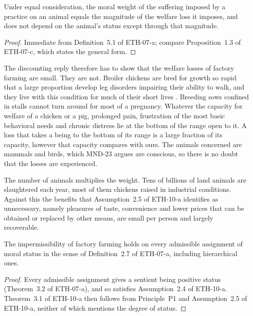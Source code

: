 \documentclass{situationist-preprint}
\begin{document}
\begin{proposition}\label{p:weight}
Under equal consideration, the moral weight of the suffering imposed by a practice on an animal equals the magnitude of the welfare loss it imposes, and does not depend on the animal's status except through that magnitude.
\end{proposition}

\begin{proof}
Immediate from Definition~5.1 of ETH-07-a; compare Proposition~1.3 of ETH-07-c, which states the general form.
\end{proof}

The discounting reply therefore has to show that the welfare losses of factory farming are small. They are not. Broiler chickens are bred for growth so rapid that a large proportion develop leg disorders impairing their ability to walk, and they live with this condition for much of their short lives \citep{Knowles2008}. Breeding sows confined in stalls cannot turn around for most of a pregnancy. Whatever the capacity for welfare of a chicken or a pig, prolonged pain, frustration of the most basic behavioral needs and chronic distress lie at the bottom of the range open to it. A loss that takes a being to the bottom of its range is a large fraction of its capacity, however that capacity compares with ours. The animals concerned are mammals and birds, which MND-23 argues are conscious, so there is no doubt that the losses are experienced.

The number of animals multiplies the weight. Tens of billions of land animals are slaughtered each year, most of them chickens raised in industrial conditions. Against this the benefits that Assumption~2.5 of ETH-10-a identifies as unnecessary, namely pleasures of taste, convenience and lower prices that can be obtained or replaced by other means, are small per person and largely recoverable.

\begin{proposition}\label{p:robust}
The impermissibility of factory farming holds on every admissible assignment of moral status in the sense of Definition~2.7 of ETH-07-a, including hierarchical ones.
\end{proposition}

\begin{proof}
Every admissible assignment gives a sentient being positive status (Theorem~3.2 of ETH-07-a), and so satisfies Assumption~2.4 of ETH-10-a. Theorem~3.1 of ETH-10-a then follows from Principle~P1 and Assumption~2.5 of ETH-10-a, neither of which mentions the degree of status.
\end{proof}
\end{document}
